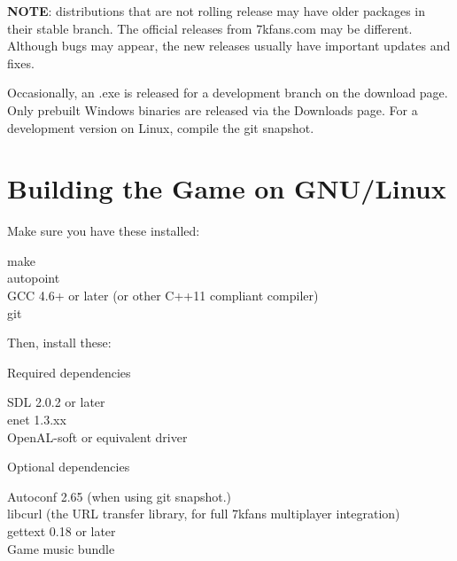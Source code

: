 
\textbf{NOTE}: distributions that are not rolling release may have older packages in their stable branch. The official releases from 7kfans.com may be different. Although bugs may appear, the new releases usually have important updates and fixes. 


Occasionally, an .exe is released for a development branch on the download page. 
Only prebuilt Windows binaries are released via the Downloads page. For a development version on Linux, compile the git snapshot.

\section{Building the Game on GNU/Linux}

Make sure you have these installed: 

\begin{adjustwidth}{1cm}{}
make \\
autopoint \\
GCC 4.6+ or later (or other C++11 compliant compiler) \\
git
\end{adjustwidth}
	
Then, install these:

Required dependencies

\begin{adjustwidth}{1cm}{}
SDL 2.0.2 or later \\
enet 1.3.xx \\
OpenAL-soft or equivalent driver
\end{adjustwidth}

Optional dependencies

\begin{adjustwidth}{1cm}{}
Autoconf 2.65 (when using git snapshot.) \\
libcurl (the URL transfer library, for full 7kfans multiplayer integration) \\
gettext 0.18 or later \\
Game music bundle
\end{adjustwidth}

